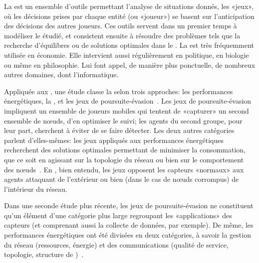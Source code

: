 La  est un ensemble d'outils permettant l'analyse de situations donnés, les «jeux», où les décisions prises par chaque entité (ou «joueur») se basent sur l'anticipation des décisions des autres joueurs.
Ces outils servent dans un premier temps à modéliser le  étudié, et consistent ensuite à résoudre des problèmes tels que la recherche d'équilibres ou de solutions optimales dans le .
La  est très fréquemment utilisée en économie.
Elle intervient aussi régulièrement en politique, en biologie ou même en philosophie.
Lui font appel, de manière plus ponctuelle, de nombreux autres domaines, dont l'informatique.

Appliquée aux \rcs, une étude classe la  selon trois approches: les performances énergétiques, la \secu, et les jeux de poursuite-évasion~\cite{MT08}.
Les jeux de poursuite-évasion impliquent un ensemble de joueurs mobiles qui tentent de «capturer» un second ensemble de nœuds, d'en optimiser le suivi; les agents du second groupe, pour leur part, cherchent à éviter de se faire détecter.
Les deux autres catégories parlent d'elles-mêmes: les jeux appliqués aux performances énergétiques recherchent des solutions optimales permettant de minimiser la consommation, que ce soit en agissant sur la topologie du réseau ou bien sur le comportement des nœuds~\cite{CPF09}.
En \secu, bien entendu, les jeux opposent les capteurs «normaux» aux agents attaquant de l'extérieur ou bien (dans le cas de nœuds corrompus) de l'intérieur du réseau.

Dans une seconde étude plus récente, les jeux de poursuite-évasion ne constituent qu'un élément d'une catégorie plus large regroupant les «applications» des capteurs (et comprenant aussi la collecte de données, par exemple).
De même, les performances énergétiques ont été divisées en deux catégories, à savoir la gestion du réseau (ressources, énergie) et des communications (qualité de service, topologie, structure de )~\cite{SWKC12}.

